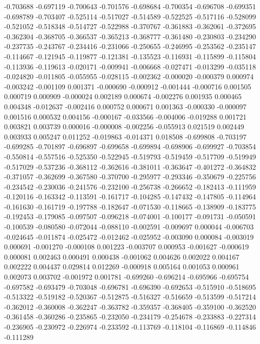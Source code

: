 -0.703688
-0.697119
-0.700643
-0.701576
-0.698684
-0.700354
-0.696708
-0.699351
-0.698789
-0.703407
-0.525114
-0.517027
-0.514589
-0.522525
-0.517116
-0.528099
-0.521052
-0.518348
-0.514727
-0.522988
-0.370767
-0.361883
-0.362061
-0.372695
-0.362304
-0.368705
-0.366537
-0.365213
-0.368777
-0.361480
-0.230803
-0.234290
-0.237735
-0.243767
-0.234416
-0.231066
-0.250655
-0.246995
-0.253562
-0.235147
-0.114667
-0.121945
-0.119877
-0.121381
-0.135523
-0.116931
-0.115899
-0.115804
-0.113936
-0.119613
-0.020171
-0.009941
-0.006668
-0.027471
-0.013299
-0.035118
-0.024820
-0.011805
-0.055955
-0.028115
-0.002362
-0.000020
-0.000379
0.000974
-0.003242
-0.001109
0.001371
-0.000690
-0.000912
-0.001444
-0.000716
0.001505
0.000719
0.000909
-0.000024
0.002189
0.000674
-0.002276
0.001935
0.000465
0.004348
-0.012637
-0.002416
0.000752
0.000671
0.001363
-0.000330
-0.000097
0.001516
0.000532
0.004156
-0.000167
-0.033566
-0.004006
-0.019288
0.001721
0.003821
0.003739
0.000016
-0.000008
-0.002256
-0.055913
0.021519
0.002449
0.003933
0.005247
0.011252
-0.019863
-0.014371
0.018508
-0.699808
-0.703197
-0.699285
-0.701897
-0.696897
-0.699658
-0.699894
-0.698906
-0.699927
-0.703854
-0.550814
-0.557516
-0.525350
-0.522945
-0.519793
-0.519459
-0.517709
-0.519949
-0.517029
-0.537236
-0.368112
-0.362616
-0.381011
-0.363647
-0.401272
-0.364832
-0.371057
-0.362699
-0.367580
-0.370700
-0.295977
-0.293346
-0.350679
-0.225756
-0.234542
-0.230036
-0.241576
-0.232100
-0.256738
-0.266652
-0.182413
-0.111959
-0.120116
-0.163342
-0.113591
-0.161717
-0.104285
-0.147432
-0.147805
-0.114964
-0.161630
-0.161719
-0.197788
-0.182647
-0.071530
-0.118665
-0.138909
-0.183775
-0.192453
-0.179085
-0.097507
-0.096218
-0.074001
-0.100177
-0.091731
-0.050591
-0.100539
-0.080580
-0.072044
-0.088110
-0.002591
-0.009697
0.000044
-0.006703
-0.024645
-0.011874
-0.025472
-0.012462
-0.025952
-0.003090
0.000084
-0.003019
0.000691
-0.001270
-0.000108
0.001223
-0.003707
0.000953
-0.001627
-0.000619
0.000081
0.002463
0.000491
0.000438
-0.001062
0.004626
0.002022
0.004167
0.002222
0.004437
0.029814
0.012269
-0.000918
0.005164
0.001053
0.000961
0.002073
0.003702
-0.001972
0.001781
-0.699260
-0.696214
-0.695966
-0.695754
-0.697582
-0.693479
-0.703048
-0.696781
-0.696390
-0.692653
-0.515910
-0.518695
-0.513322
-0.519182
-0.520367
-0.512875
-0.516327
-0.516659
-0.513599
-0.517214
-0.362012
-0.360008
-0.362247
-0.363782
-0.359357
-0.368405
-0.359100
-0.362520
-0.361458
-0.360286
-0.235865
-0.232050
-0.234179
-0.254678
-0.233883
-0.227314
-0.236905
-0.230972
-0.226974
-0.233592
-0.113769
-0.118104
-0.116869
-0.114846
-0.111289
